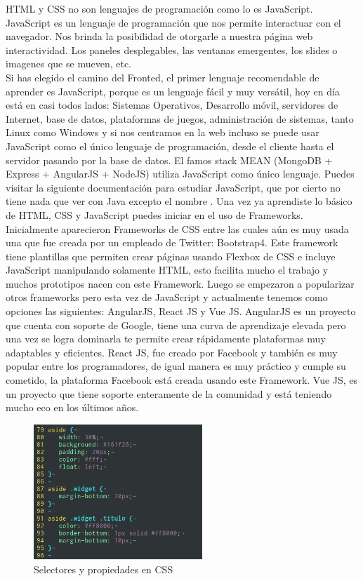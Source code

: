 \documentclass[twocolumns,a4paper]{IEEEtran}
\begin{document}
HTML y CSS no son lenguajes de programación como lo es JavaScript. JavaScript
es un lenguaje de programación que nos permite interactuar con el navegador.
Nos brinda la posibilidad de otorgarle a nuestra página web interactividad. Los
paneles desplegables, las ventanas emergentes, los slides o imagenes que se
mueven, etc.\\
Si has elegido el camino del Fronted, el primer lenguaje recomendable de
aprender es JavaScript, porque es un lenguaje fácil y muy versátil, hoy en día
está en casi todos lados: Sistemas Operativos, Desarrollo móvil, servidores de
Internet, base de datos, plataformas de juegos, administración de sistemas,
tanto Linux como Windows y si nos centramos en la web incluso se puede usar
JavaScript como el único lenguaje de programación, desde el cliente hasta el
servidor pasando por la base de datos. El famos stack MEAN (MongoDB + Express +
AngularJS + NodeJS) utiliza JavaScript como único lenguaje.
Puedes visitar la siguiente documentación para estudiar JavaScript, que por
cierto no tiene nada que ver con Java excepto el nombre
\cite{JavaScriptw3:2018:online} \cite{PluralsightJavaScript:2018:online}.
Una vez ya aprendiste lo básico de HTML, CSS y JavaScript puedes iniciar en el
uso de Frameworks.\\
Inicialmente aparecieron Frameworks de CSS entre las cuales
aún es muy usada una que fue creada por un empleado de Twitter: Bootstrap4.
Este framework tiene plantillas que permiten crear páginas usando Flexbox de
CSS e incluye JavaScript manipulando solamente HTML, esto facilita mucho el
trabajo y muchos prototipos nacen con este Framework.
Luego se empezaron a popularizar otros frameworks pero esta vez de JavaScript y
actualmente tenemos como opciones las siguientes: AngularJS, React JS y Vue JS.
AngularJS es un proyecto que cuenta con soporte de Google, tiene una curva de
aprendizaje elevada pero una vez se logra dominarla te permite crear
rápidamente plataformas muy adaptables y eficientes. React JS, fue creado por
Facebook y también es muy popular entre los programadores, de igual manera es
muy práctico y cumple su cometido, la plataforma Facebook está creada usando
este Framework. Vue JS, es un proyecto que tiene soporte enteramente de la
comunidad y está teniendo mucho eco en los últimos años.

\begin{figure}[ht]
   \centering
      \includegraphics[width=2.5in]{./pictures/css_ejemplo.png}
   \caption{Selectores y propiedades en CSS}
   \label{fig:css_ejemplo}
\end{figure}
\end{document}
